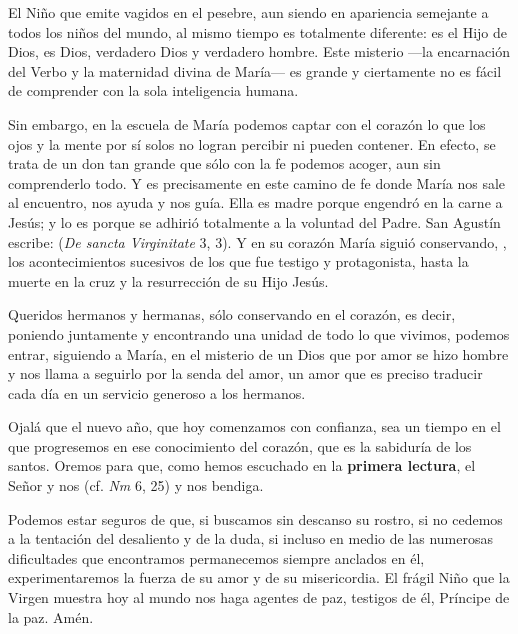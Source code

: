 \begin{body}
	El Niño que emite vagidos en el pesebre, aun siendo en apariencia semejante a todos los niños del mundo, al mismo tiempo es totalmente diferente: es el Hijo de Dios, es Dios, verdadero Dios y verdadero hombre. Este misterio ---la encarnación del Verbo y la maternidad divina de María--- es grande y ciertamente no es fácil de comprender con la sola inteligencia humana.
	
	Sin embargo, en la escuela de María podemos captar con el corazón lo que los ojos y la mente por sí solos no logran percibir ni pueden contener. En efecto, se trata de un don tan grande que sólo con la fe podemos acoger, aun sin comprenderlo todo. Y es precisamente en este camino de fe donde María nos sale al encuentro, nos ayuda y nos guía. Ella es madre porque engendró en la carne a Jesús; y lo es porque se adhirió totalmente a la voluntad del Padre. San Agustín escribe:  (\emph{De sancta Virginitate} 3, 3). Y en su corazón María siguió conservando, , los acontecimientos sucesivos de los que fue testigo y protagonista, hasta la muerte en la cruz y la resurrección de su Hijo Jesús.
	
	Queridos hermanos y hermanas, sólo conservando en el corazón, es decir, poniendo juntamente y encontrando una unidad de todo lo que vivimos, podemos entrar, siguiendo a María, en el misterio de un Dios que por amor se hizo hombre y nos llama a seguirlo por la senda del amor, un amor que es preciso traducir cada día en un servicio generoso a los hermanos.
	
	Ojalá que el nuevo año, que hoy comenzamos con confianza, sea un tiempo en el que progresemos en ese conocimiento del corazón, que es la sabiduría de los santos. Oremos para que, como hemos escuchado en la \textbf{primera lectura}, el Señor  y nos  (cf. \emph{Nm} 6, 25) y nos bendiga.
	
	Podemos estar seguros de que, si buscamos sin descanso su rostro, si no cedemos a la tentación del desaliento y de la duda, si incluso en medio de las numerosas dificultades que encontramos permanecemos siempre anclados en él, experimentaremos la fuerza de su amor y de su misericordia. El frágil Niño que la Virgen muestra hoy al mundo nos haga agentes de paz, testigos de él, Príncipe de la paz. Amén.
\end{body}

